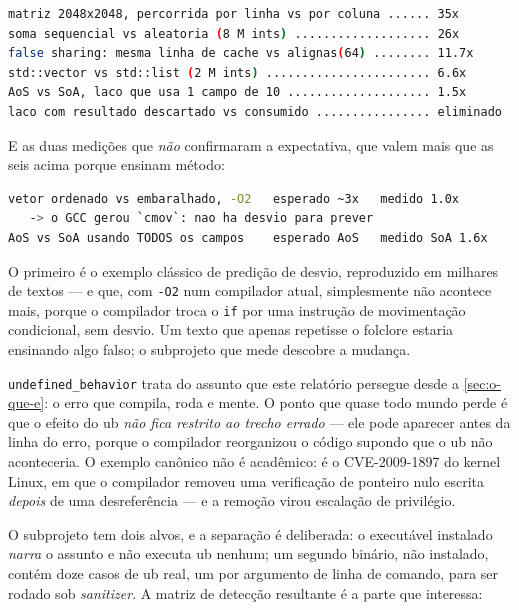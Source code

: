 \begin{lstlisting}[style=bt, language=bash,
    caption={Saída de \texttt{src/performance/}: a assimetria entre processador
             e memória, em razões medidas nesta máquina.}]
matriz 2048x2048, percorrida por linha vs por coluna ...... 35x
soma sequencial vs aleatoria (8 M ints) ................... 26x
false sharing: mesma linha de cache vs alignas(64) ........ 11.7x
std::vector vs std::list (2 M ints) ....................... 6.6x
AoS vs SoA, laco que usa 1 campo de 10 .................... 1.5x
laco com resultado descartado vs consumido ................ eliminado
\end{lstlisting}

E as duas medições que \emph{não} confirmaram a expectativa, que valem mais que
as seis acima porque ensinam método:

\begin{lstlisting}[style=bt, language=bash,
    caption={Saída de \texttt{src/performance/}: os dois experimentos em que a
             expectativa estava errada.}]
vetor ordenado vs embaralhado, -O2   esperado ~3x   medido 1.0x
   -> o GCC gerou `cmov`: nao ha desvio para prever
AoS vs SoA usando TODOS os campos    esperado AoS   medido SoA 1.6x
\end{lstlisting}

O primeiro é o exemplo clássico de predição de desvio, reproduzido em milhares
de textos --- e que, com \texttt{-O2} num compilador atual, simplesmente não
acontece mais, porque o compilador troca o \texttt{if} por uma instrução de
movimentação condicional, sem desvio. Um texto que apenas repetisse o folclore
estaria ensinando algo falso; o subprojeto que mede descobre a mudança.

\texttt{undefined\_behavior} trata do assunto que este relatório persegue desde
a \cref{sec:o-que-e}: o erro que compila, roda e mente. O ponto que quase todo
mundo perde é que o efeito do \gls{ub} \emph{não fica restrito ao trecho
errado} --- ele pode aparecer antes da linha do erro, porque o compilador
reorganizou o código supondo que o \gls{ub} não aconteceria. O exemplo canônico
não é acadêmico: é o CVE-2009-1897 do kernel Linux, em que o compilador removeu
uma verificação de ponteiro nulo escrita \emph{depois} de uma desreferência ---
e a remoção virou escalação de privilégio.

O subprojeto tem dois alvos, e a separação é deliberada: o executável instalado
\emph{narra} o assunto e não executa \gls{ub} nenhum; um segundo binário, não
instalado, contém doze casos de \gls{ub} real, um por argumento de linha de
comando, para ser rodado sob \emph{sanitizer}. A matriz de detecção resultante
é a parte que interessa:

